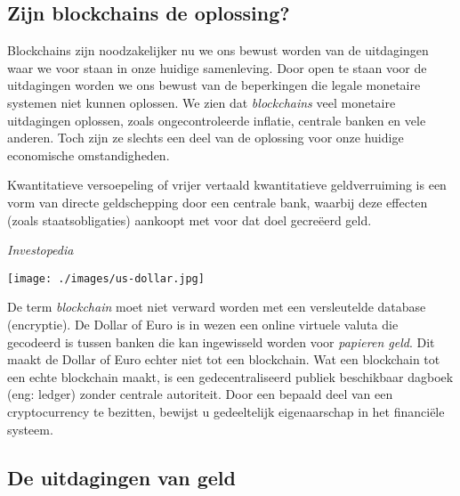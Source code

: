 \documentclass[11pt]{article}
\begin{document}
\subsection{Zijn blockchains de oplossing?}

Blockchains zijn noodzakelijker nu we ons bewust worden van de uitdagingen waar we voor staan ​​in onze huidige samenleving. Door open te staan voor de uitdagingen worden we ons bewust van de beperkingen die legale monetaire systemen niet kunnen oplossen. We zien dat \textit{blockchains} veel monetaire uitdagingen oplossen, zoals ongecontroleerde inflatie, centrale banken en vele anderen. Toch zijn ze slechts een deel van de oplossing voor onze huidige economische omstandigheden.

\epigraph{Kwantitatieve versoepeling of vrijer vertaald kwantitatieve geldverruiming is een vorm van directe geldschepping door een centrale bank, waarbij deze effecten (zoals staatsobligaties) aankoopt met voor dat doel gecreëerd geld.}{\textit{Investopedia}}

\vspace{-138pt}
\hspace{-25pt}
\texttt{[image: ./images/us-dollar.jpg]}
\vspace{5pt}

\noindent
De term \textit{blockchain} moet niet verward worden met een versleutelde database (encryptie). De Dollar of Euro is in wezen een online virtuele valuta die gecodeerd is tussen banken die kan ingewisseld worden voor \textit{papieren geld}. Dit maakt de Dollar of Euro echter niet tot een blockchain. Wat een blockchain tot een echte blockchain maakt, is een gedecentraliseerd publiek beschikbaar dagboek (eng: ledger)  zonder centrale autoriteit. 
Door een bepaald deel van een cryptocurrency te bezitten, bewijst u gedeeltelijk eigenaarschap in het financiële systeem.


\subsection{De uitdagingen van geld}
\end{document}
